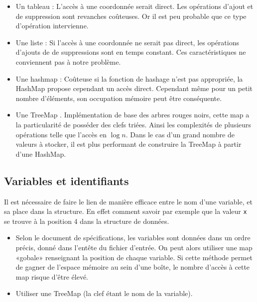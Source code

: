\begin{itemize}
\item
  Un tableau : L'accès à une coordonnée serait direct. Les opérations d'ajout et de suppression sont revanches coûteuses. Or il est peu probable que ce type d'opération intervienne. 
\item
  Une liste : Si l'accès à une coordonnée ne serait pas direct, les opérations d'ajouts de de suppressions sont en temps constant. Ces caractéristiques ne conviennent pas à notre problème.
\item
  Une hashmap : Coûteuse si la fonction de hashage n'est pas appropriée, la HashMap propose cependant un accès direct. Cependant même pour un petit nombre d'éléments, son occupation mémoire peut être conséquente. 
\item
  Une TreeMap \cite{TreeMap}. Implémentation de base des arbres rouges noirs, cette map a la particularité de posséder des clefs triées. Ainsi les complexités de plusieurs opérations telle que l'accès en $\log{n}$. Dans le cas d'un grand nombre de valeurs à stocker, il est plus performant de construire la TreeMap à partir d'une HashMap.

\end{itemize}


\subsection{Variables et identifiants}
Il est nécessaire de faire le lien de manière efficace entre le nom d'une variable, et sa place dans la structure. En effet comment savoir par exemple que la valeur \verb+x+ se trouve à la position 4 dans la structure de données.
\begin{itemize}
\item
  Selon le document de spécifications, les variables sont données dans un ordre précis, donné dans l'entête du fichier d'entrée. On peut alors utiliser une map «gobale» renseignant la position de chaque variable. Si cette méthode permet de gagner de l'espace mémoire au sein d'une boîte, le nombre d'accès à cette map risque d'être élevé.
\item
  Utiliser une TreeMap (la clef étant le nom de la variable).
\end{itemize} 

